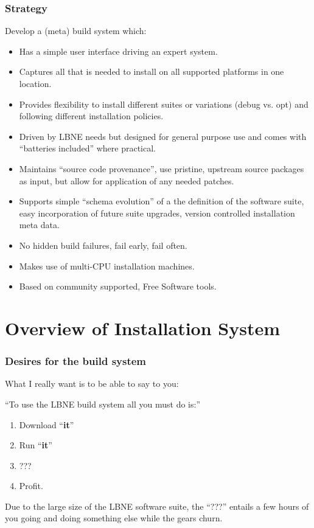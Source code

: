 \documentclass[xcolor=dvipsnames]{beamer}
\begin{document}
\begin{frame}
  \frametitle{Strategy}
  Develop a (meta) build system which:
  \footnotesize
  \begin{itemize}
  \item Has a simple user interface driving an expert system.
  \item Captures all that is needed to install on all supported platforms in one location.
  \item Provides flexibility to install different suites or variations (debug vs. opt) and following different installation policies.
  \item Driven by LBNE needs but designed for general purpose use and comes with ``batteries included'' where practical.
  \item Maintains ``source code provenance'', use pristine, upstream source packages as input, but allow for application of any needed patches.
  \item Supports simple ``schema evolution'' of a the definition of the software suite,  easy incorporation of future suite upgrades, version controlled installation meta data.
  \item No hidden build failures, fail early, fail often.
  \item Makes use of multi-CPU installation machines.
  \item Based on community supported, Free Software tools.
  \end{itemize}
\end{frame}

\section{Overview of Installation System}


\begin{frame}
  \frametitle{Desires for the build system}
  What I really want is to be able to say to you:

  ``To use the LBNE build system all you must do is:''
  \vspace{5mm}
  \begin{enumerate}
  \item Download ``\textbf{it}''
  \item Run ``\textbf{it}''
  \item ???
  \item Profit.
  \end{enumerate}

  \vspace{5mm}

  Due to the large size of the LBNE software suite, the ``???''
  entails a few hours of you going and doing something else while the
  gears churn.
  
\end{frame}
\end{document}
